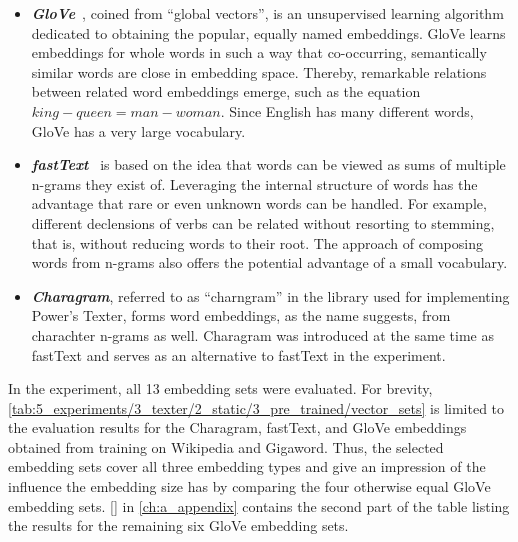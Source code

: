 \begin{itemize}
    \item \textbf{\emph{GloVe}}~\cite{Pennington2014GloveGV}, coined from ``global vectors'', is an unsupervised learning algorithm dedicated to obtaining the popular, equally named embeddings. GloVe learns embeddings for whole words in such a way that co-occurring, semantically similar words are close in embedding space. Thereby, remarkable relations between related word embeddings emerge, such as the equation $king - queen = man - woman$. Since English has many different words, GloVe has a very large vocabulary.

    \item \textbf{\emph{fastText}}~\cite{Bojanowski2017EnrichingWV,Mikolov2018AdvancesIP}  is based on the idea that words can be viewed as sums of multiple n-grams they exist of. Leveraging the internal structure of words has the advantage that rare or even unknown words can be handled. For example, different declensions of verbs can be related without resorting to stemming, that is, without reducing words to their root. The approach of composing words from n-grams also offers the potential advantage of a small vocabulary.

    \item \textbf{\emph{Charagram}}, referred to as ``charngram'' in the library used for implementing Power's Texter, forms word embeddings, as the name suggests, from charachter n-grams as well. Charagram was introduced at the same time as fastText and serves as an alternative to fastText in the experiment.
\end{itemize}

In the experiment, all 13 embedding sets were evaluated. For brevity, \autoref{tab:5_experiments/3_texter/2_static/3_pre_trained/vector_sets} is limited to the evaluation results for the Charagram, fastText, and GloVe embeddings obtained from training on Wikipedia and Gigaword. Thus, the selected embedding sets cover all three embedding types and give an impression of the influence the embedding size has by comparing the four otherwise equal GloVe embedding sets. \autoref{} in \autoref{ch:a_appendix} contains the second part of the table listing the results for the remaining six GloVe embedding sets.

